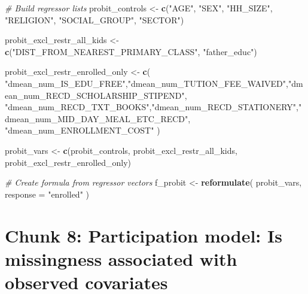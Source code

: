 \documentclass[
]{article}
\newenvironment{Shaded}{\begin{snugshade}}{\end{snugshade}}
\newcommand{\AttributeTok}[1]{\textcolor[rgb]{0.13,0.29,0.53}{#1}}
\newcommand{\CommentTok}[1]{\textcolor[rgb]{0.56,0.35,0.01}{\textit{#1}}}
\newcommand{\FunctionTok}[1]{\textcolor[rgb]{0.13,0.29,0.53}{\textbf{#1}}}
\newcommand{\NormalTok}[1]{#1}
\newcommand{\OtherTok}[1]{\textcolor[rgb]{0.56,0.35,0.01}{#1}}
\newcommand{\StringTok}[1]{\textcolor[rgb]{0.31,0.60,0.02}{#1}}
\begin{document}
\begin{Shaded}
\begin{Highlighting}[]
\CommentTok{\# Build regressor lists}
\NormalTok{probit\_controls   }\OtherTok{\textless{}{-}} \FunctionTok{c}\NormalTok{(}\StringTok{"AGE"}\NormalTok{,}
                       \StringTok{"SEX"}\NormalTok{,}
                       \StringTok{"HH\_SIZE"}\NormalTok{,}
                       \StringTok{"RELIGION"}\NormalTok{,}
                       \StringTok{"SOCIAL\_GROUP"}\NormalTok{,}
                       \StringTok{"SECTOR"}\NormalTok{)}

\NormalTok{probit\_excl\_restr\_all\_kids }\OtherTok{\textless{}{-}} \FunctionTok{c}\NormalTok{(}\StringTok{"DIST\_FROM\_NEAREST\_PRIMARY\_CLASS"}\NormalTok{,}
                       \StringTok{"father\_educ"}\NormalTok{)}

\NormalTok{probit\_excl\_restr\_enrolled\_only }\OtherTok{\textless{}{-}} \FunctionTok{c}\NormalTok{(}
  \StringTok{"dmean\_num\_IS\_EDU\_FREE"}\NormalTok{,}\StringTok{"dmean\_num\_TUTION\_FEE\_WAIVED"}\NormalTok{,}\StringTok{"dmean\_num\_RECD\_SCHOLARSHIP\_STIPEND"}\NormalTok{,}
  \StringTok{"dmean\_num\_RECD\_TXT\_BOOKS"}\NormalTok{,}\StringTok{"dmean\_num\_RECD\_STATIONERY"}\NormalTok{,}\StringTok{"dmean\_num\_MID\_DAY\_MEAL\_ETC\_RECD"}\NormalTok{,}
  \StringTok{"dmean\_num\_ENROLLMENT\_COST"}
\NormalTok{)}


\NormalTok{probit\_vars }\OtherTok{\textless{}{-}} \FunctionTok{c}\NormalTok{(probit\_controls, probit\_excl\_restr\_all\_kids, probit\_excl\_restr\_enrolled\_only)}

\CommentTok{\# Create formula from regressor vectors}
\NormalTok{f\_probit }\OtherTok{\textless{}{-}} \FunctionTok{reformulate}\NormalTok{(}
\NormalTok{  probit\_vars,}
  \AttributeTok{response =} \StringTok{"enrolled"}
\NormalTok{  )}
\end{Highlighting}
\end{Shaded}

\section*{Chunk 8: Participation model: Is missingness associated with observed covariates}\label{chunk-8-participation-model-is-missingness-associated-with-observed-covariates}
\end{document}
